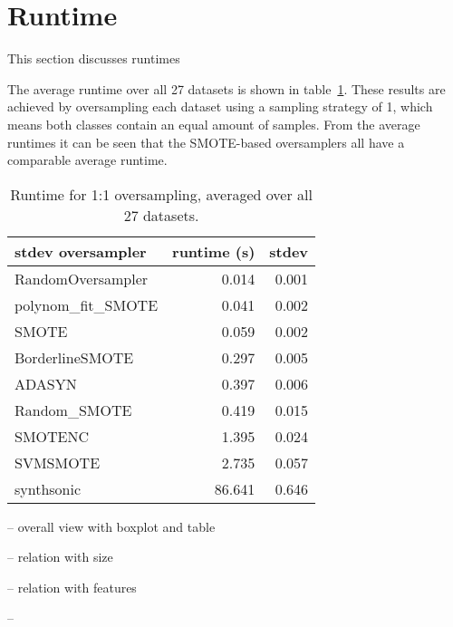 \section{Runtime}
This section discusses runtimes

The average runtime over all 27 datasets is shown in table~\ref{tab:runtimes}. These results are achieved by oversampling each dataset using a sampling strategy of 1, which means both classes contain an equal amount of samples. From the average runtimes it can be seen that the SMOTE-based oversamplers all have a comparable average runtime. 

\begin{table}[]
    \centering
    \begin{tabular}{lrr}
    \toprule
    stdev oversampler & runtime (s) &  stdev \\
    \midrule
    RandomOversampler &    0.014 &        0.001 \\
    polynom\_fit\_SMOTE &    0.041 &        0.002 \\
    SMOTE             &    0.059 &        0.002 \\
    BorderlineSMOTE   &    0.297 &        0.005 \\
    ADASYN            &    0.397 &        0.006 \\
    Random\_SMOTE      &    0.419 &        0.015 \\
    SMOTENC           &    1.395 &        0.024 \\
    SVMSMOTE          &    2.735 &        0.057 \\
    synthsonic        &   86.641 &        0.646 \\
    \bottomrule
    \end{tabular}
    \caption{Runtime for 1:1 oversampling, averaged over all 27 datasets.}
    \label{tab:runtimes}
\end{table}



-- overall view with boxplot and table


-- relation with size 

-- relation with features

-- 

